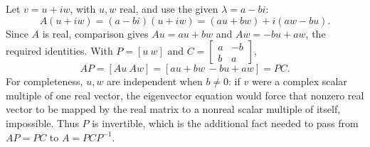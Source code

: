 Let $v=u+iw$, with $u,w$ real, and use the given $\lambda=a-bi$:
\[
A(u+iw)=(a-bi)(u+iw)=(au+bw)+i(aw-bu).
\]
Since $A$ is real, comparison gives $Au=au+bw$ and $Aw=-bu+aw$, the required identities.
With $P=[u\ w]$ and $C=\left[\begin{smallmatrix}a&-b\\b&a\end{smallmatrix}\right]$,
\[
AP=[Au\ Aw]=[au+bw\ -bu+aw]=PC.
\]
For completeness, $u,w$ are independent when $b\ne0$: if $v$ were a complex scalar multiple of one real vector, the eigenvector equation would force that nonzero real vector to be mapped by the real matrix to a nonreal scalar multiple of itself, impossible. Thus $P$ is invertible, which is the additional fact needed to pass from $AP=PC$ to $A=PCP^{-1}$.


